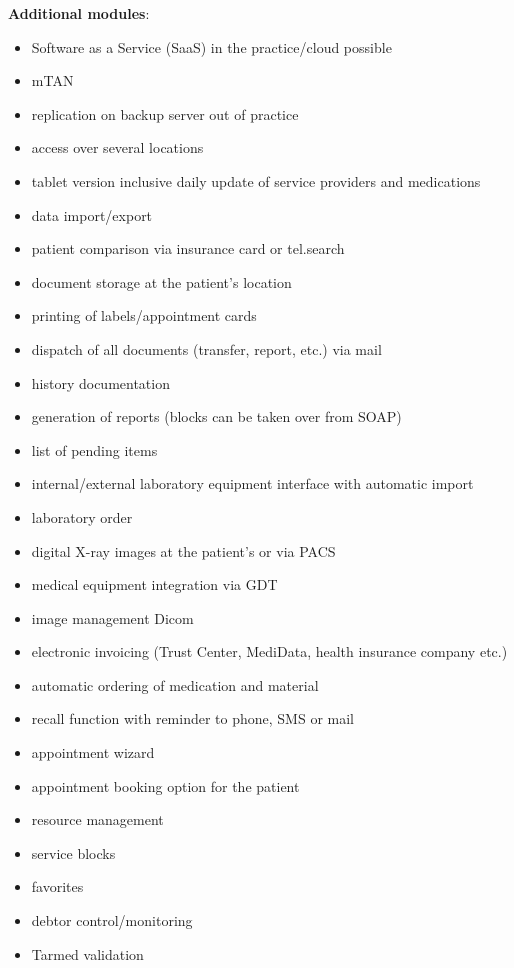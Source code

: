 \documentclass{report}
\begin{document}
\textbf{Additional modules}: 
\begin{itemize}
   \item Software as a Service (SaaS) in the practice/cloud possible
   \item mTAN
   \item replication on backup server out of practice
   \item access over several locations
   \item tablet version inclusive daily update of service providers and medications
   \item data import/export
   \item patient comparison via insurance card or tel.search
   \item document storage at the patient's location
   \item printing of labels/appointment cards
   \item dispatch of all documents (transfer, report, etc.) via mail
   \item history documentation
   \item generation of reports (blocks can be taken over from SOAP)
   \item list of pending items
   \item internal/external laboratory equipment interface with automatic import
   \item laboratory order
   \item digital X-ray images at the patient's or via PACS
   \item medical equipment integration via GDT
   \item image management Dicom
   \item electronic invoicing (Trust Center, MediData, health insurance company etc.)
   \item automatic ordering of medication and material
   \item recall function with reminder to phone, SMS or mail
   \item appointment wizard
   \item appointment booking option for the patient
   \item resource management
   \item service blocks
   \item favorites
   \item debtor control/monitoring
   \item Tarmed validation 
\end{itemize}
\end{document}
